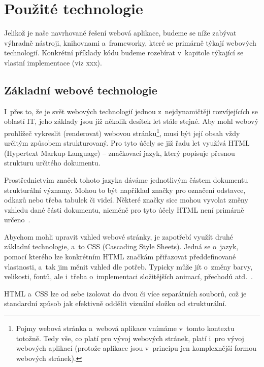 \hypertarget{pouux17eituxe9-technologie}{%
\section{Použité technologie}\label{pouux17eituxe9-technologie}}

Jelikož je naše navrhované řešení webová aplikace, budeme se níže zabývat výhradně nástroji, knihovnami a~frameworky, které se primárně týkají webových technologií. Konkrétní příklady kódu budeme rozebírat v~kapitole týkající se vlastní implementace (viz xxx).

\hypertarget{zuxe1kladnuxed-webovuxe9-technologie}{%
\subsection{Základní webové technologie}\label{zuxe1kladnuxed-webovuxe9-technologie}}

I~přes to, že je svět webových technologií jednou z~nejdynamičtěji rozvíjejících se oblastí IT, jeho základy jsou již několik desítek let stále stejné. Aby mohl webový prohlížeč vykreslit (renderovat) webovou stránku\footnote{Pojmy webová stránka a~webová aplikace vnímáme v~tomto kontextu totožně. Tedy vše, co platí pro vývoj webových stránek, platí i~pro vývoj webových aplikací (protože aplikace jsou v~principu jen komplexnější formou webových stránek).}, musí být její obsah vždy určitým způsobem strukturovaný. Pro tyto účely se již řadu let využívá HTML (Hypertext Markup Language) -- značkovací jazyk, který popisuje přesnou strukturu určitého dokumentu.

Prostřednictvím značek tohoto jazyka dáváme jednotlivým částem dokumentu strukturální významy. Mohou to být například značky pro označení odstavce, odkazů nebo třeba tabulek či videí. Některé značky sice mohou vyvolat změny vzhledu dané části dokumentu, nicméně pro tyto účely HTML není primárně určeno~\parencite{htmlcss}.

Abychom mohli upravit vzhled webové stránky, je zapotřebí využít druhé základní technologie, a~to CSS (Cascading Style Sheets). Jedná se o~jazyk, pomocí kterého lze konkrétním HTML značkám přiřazovat předdefinované vlastnosti, a~tak jim měnit vzhled dle potřeb. Typicky může jít o~změny barvy, velikosti, fontů, ale i~třeba o~implementaci složitějších animací, přechodů atd.~\parencite{htmlcss}.

HTML a~CSS lze od sebe izolovat do dvou či více separátních souborů, což je standardní způsob jak efektivně oddělit vizuální složku od strukturální.

